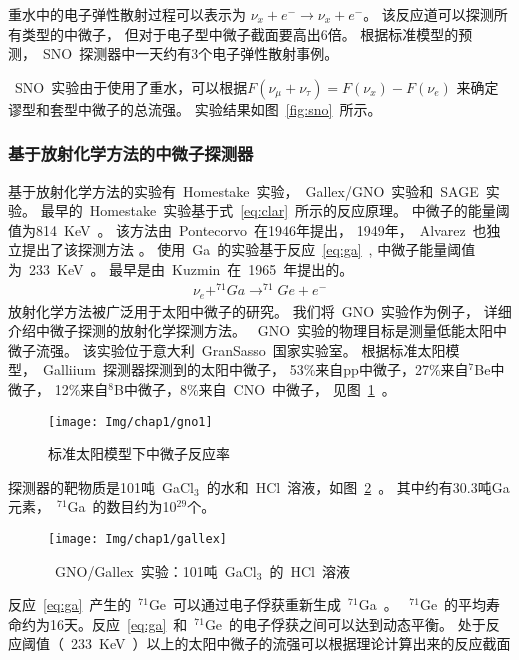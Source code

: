 重水中的电子弹性散射过程可以表示为
$\nu_x + e^- \rightarrow \nu_x +e^- $。
该反应道可以探测所有类型的中微子，
但对于电子型中微子截面要高出6倍。
根据标准模型的预测，~SNO~探测器中一天约有3个电子弹性散射事例。

~SNO~实验由于使用了重水，可以根据$F(\nu_{\mu} + \nu_{\tau})=F(\nu_x)-F(\nu_e)$
来确定谬型和套型中微子的总流强。
实验结果如图~\ref{fig:sno}~所示\citep{ahmad2002direct,aharmim2013combined}。

\subsubsection{基于放射化学方法的中微子探测器}
基于放射化学方法的实验有~Homestake~实验，~Gallex/GNO~实验和~SAGE~实验。
最早的~Homestake~实验基于式~\ref{eq:clar}~所示的反应原理。
中微子的能量阈值为814~KeV~\citep{cleveland1995update}。
该方法由~Pontecorvo~在1946年提出\citep{pontecorvo1946chalk}，
1949年，~Alvarez~也独立提出了该探测方法 \citep{alvarez1949university}。
使用~Ga~的实验基于反应~\ref{eq:ga}~, 中微子能量阈值为~233~KeV~。
最早是由~Kuzmin~在~1965~年提出的\citep{kuzmin1965solar}。
\begin{eqnarray}\label{eq:ga}
\nu_e + ^{71}Ga \rightarrow ^{71}Ge + e^-
\end{eqnarray}
放射化学方法被广泛用于太阳中微子的研究。
我们将~GNO~实验\citep{collaboration1996proposal}作为例子，
详细介绍中微子探测的放射化学探测方法。
~GNO~实验的物理目标是测量低能太阳中微子流强。
该实验位于意大利~GranSasso~国家实验室。
根据标准太阳模型，~Galliium~探测器探测到的太阳中微子，
53\%来自pp中微子，27\%来自$^7$Be中微子，
12\%来自$^8$B中微子，8\%来自~CNO~中微子\citep{bahcall2001solar}，
见图~\ref{fig:gno1}~。
\begin{figure}[!htb]
  \centering
   \texttt{[image: Img/chap1/gno1]}
    \caption{ 标准太阳模型下中微子反应率}
  \label{fig:gno1}
\end{figure}
探测器的靶物质是101吨~GaCl$_3$~的水和~HCl~溶液，如图~\ref{fig:gallex}~。
其中约有30.3吨Ga元素，~$^{71}$Ga~的数目约为10$^{29}$个。
\begin{figure}[!htb]
  \centering
   \texttt{[image: Img/chap1/gallex]}
    \caption{~GNO/Gallex~实验：101吨~GaCl$_3$~的~HCl~溶液}
  \label{fig:gallex}
\end{figure}
反应~\ref{eq:ga}~产生的~$^{71}$Ge~可以通过电子俘获重新生成~$^{71}$Ga~。
~$^{71}$Ge~的平均寿命约为16天。反应~\ref{eq:ga}~和~$^{71}$Ge~的电子俘获之间可以达到动态平衡。
处于反应阈值（~233~KeV~）以上的太阳中微子的流强可以根据理论计算出来的反应截面
